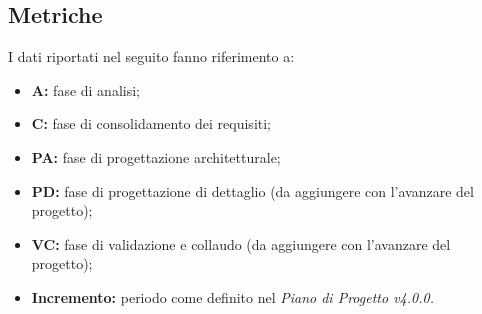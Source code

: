 \subsection{Metriche}
I dati riportati nel seguito fanno riferimento a:
\begin{itemize}
    \item \textbf{A:} fase di analisi;
    \item \textbf{C:} fase di consolidamento dei requisiti;
    \item \textbf{PA:} fase di progettazione architetturale;
    \item \textbf{PD:} fase di progettazione di dettaglio (da aggiungere con l'avanzare del progetto);
    \item \textbf{VC:} fase di validazione e collaudo (da aggiungere con l'avanzare del progetto);
    \item \textbf{Incremento:} periodo come definito nel \textit{Piano di Progetto v4.0.0.}
\end{itemize}
